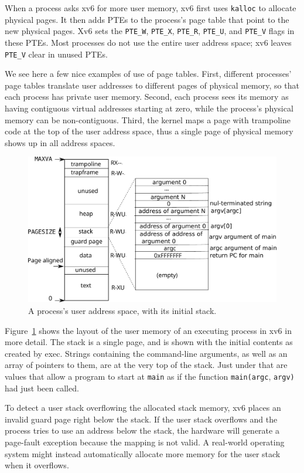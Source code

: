 When a process asks xv6 for more user memory,
xv6 first uses {\tt kalloc} to allocate physical pages.
It then adds PTEs to the process's page table that point
to the new physical pages.
Xv6 sets the
\lstinline{PTE_W},
\lstinline{PTE_X},
\lstinline{PTE_R},
\lstinline{PTE_U},
and
\lstinline{PTE_V}
flags in these PTEs.
Most processes do not use the entire user address space;
xv6 leaves
\lstinline{PTE_V}
clear in unused PTEs.

We see here a few nice examples of use of page tables.  First,
different processes' page tables translate user addresses to different
pages of physical memory, so that each process has private user
memory.  Second, each process sees its memory as having contiguous
virtual addresses starting at zero, while the process's physical
memory can be non-contiguous.  Third, the kernel maps a page with
trampoline code at the top of
the user address space, thus a single page of physical memory
shows up in all address spaces.

\begin{figure}[t]
\center
\includegraphics[scale=0.5]{fig/processlayout.pdf}
\caption{A process's user address space, with its initial stack.}
\label{fig:processlayout}
\end{figure}

Figure~\ref{fig:processlayout} shows the layout of the user memory of
an executing process in xv6 in more detail.  The stack is a single
page, and is shown with the initial contents as created by exec.
Strings containing the command-line arguments, as well as an array of
pointers to them, are at the very top of the stack.  Just under that
are values that allow a program to start at \lstinline{main} as if the
function \lstinline{main(argc}, \lstinline{argv)} had just
been called.

To detect a user stack overflowing the allocated stack memory, xv6
places an invalid guard page right below the stack. If the user stack
overflows and the process tries to use an address below the stack, the
hardware will generate a page-fault exception because the mapping is
not valid. A real-world operating system might instead automatically
allocate more memory for the user stack when it overflows.

